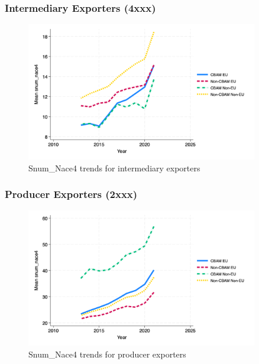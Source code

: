 \documentclass{article}
\begin{document}
\subsubsection{Intermediary Exporters (4xxx)}
\begin{figure}[h!]
\centering
\includegraphics[width=0.9\textwidth]{snum_nace4_ei.png}
\caption{Snum_Nace4 trends for intermediary exporters}
\label{fig:snum_nace4_ei}
\end{figure}

\subsubsection{Producer Exporters (2xxx)}
\begin{figure}[h!]
\centering
\includegraphics[width=0.9\textwidth]{snum_nace4_ep.png}
\caption{Snum_Nace4 trends for producer exporters}
\label{fig:snum_nace4_ep}
\end{figure}
\end{document}
